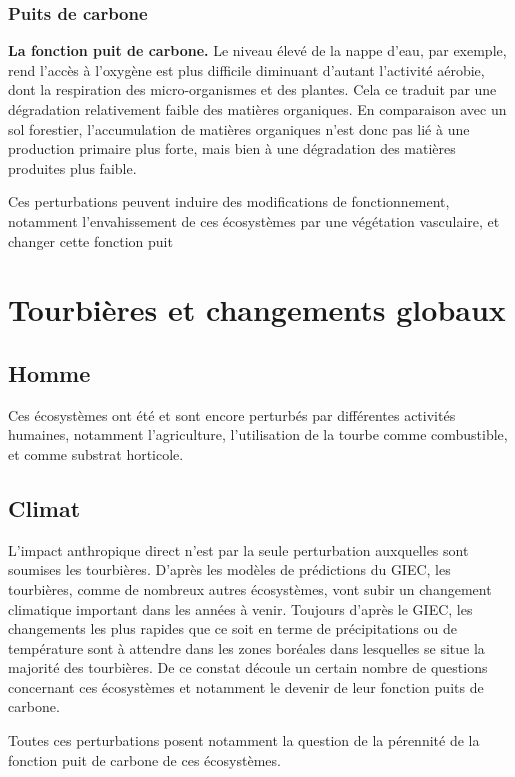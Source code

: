 \subsubsection{Puits de carbone}
\textbf{La fonction puit de carbone.}
Le niveau élevé de la nappe d'eau, par exemple, rend l'accès à l'oxygène est plus difficile diminuant d'autant l'activité aérobie, dont la respiration des micro-organismes et des plantes.
Cela ce traduit par une dégradation relativement faible des matières organiques.
En comparaison avec un sol forestier, l'accumulation de matières organiques n'est donc pas lié à une production primaire plus forte, mais bien à une dégradation des matières produites plus faible.

Ces perturbations peuvent induire des modifications de fonctionnement, notamment l'envahissement de ces écosystèmes par une végétation vasculaire, et changer cette fonction puit

\section{Tourbières et changements globaux}

\subsection{Homme}
Ces écosystèmes ont été et sont encore perturbés par différentes activités humaines, notamment l'agriculture, l'utilisation de la tourbe comme combustible, et comme substrat horticole.

\subsection{Climat}
L'impact anthropique direct n'est par la seule perturbation auxquelles sont soumises les tourbières.
D'après les modèles de prédictions du GIEC, les tourbières, comme de nombreux autres écosystèmes, vont subir un changement climatique important dans les années à venir.
Toujours d'après le GIEC, les changements les plus rapides que ce soit en terme de précipitations ou de température sont à attendre dans les zones boréales dans lesquelles se situe la majorité des tourbières.
De ce constat découle un certain nombre de questions concernant ces écosystèmes et notamment le devenir de leur fonction puits de carbone.


Toutes ces perturbations posent notamment la question de la pérennité de la fonction puit de carbone de ces écosystèmes.

